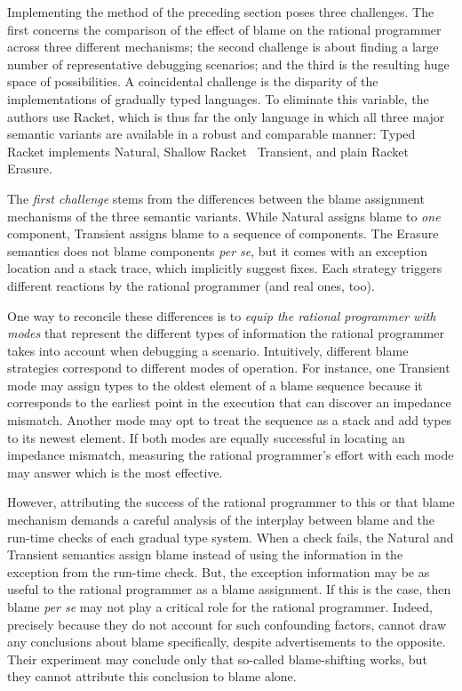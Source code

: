 
Implementing the method of the preceding section poses three challenges.  The
first concerns the comparison of the effect of blame on the rational programmer
across three different mechanisms; the second challenge is about finding a large
number of representative debugging scenarios; and the third is the resulting
huge space of possibilities. A coincidental challenge is the disparity of the
implementations of gradually typed languages. To eliminate this variable, the
authors use Racket, which is thus far the only language in which all three major
semantic variants are available in a robust and comparable manner: Typed Racket
implements Natural, Shallow Racket~\citep{ttt21} Transient, and plain Racket
Erasure.

The {\em first challenge\/} stems from the differences between the blame
assignment mechanisms of the three semantic variants.  While Natural assigns
blame to {\em one\/} component, Transient assigns blame to a sequence of
components. The Erasure semantics does not blame components {\it per se\/}, but
it comes with an exception location and a stack trace, which implicitly suggest
fixes.  Each strategy triggers different reactions by the rational programmer
(and real ones, too).

One way to reconcile these differences is to {\em equip the rational
programmer with modes \/} that represent the different types of
information the rational programmer takes into account when debugging a
scenario. Intuitively, different
blame strategies correspond to different modes of operation.
For instance, one Transient mode may assign types to the oldest element of a
blame sequence because it corresponds to the
earliest point in the execution that can discover an impedance
mismatch.  Another mode may opt to treat the sequence as a stack and add
types to its newest element.  If both modes are equally successful in
locating an impedance mismatch, measuring the rational programmer's effort with each mode
may answer which is the most effective.

However, attributing the success of the rational programmer to this or
that blame mechanism demands a careful analysis of the interplay between blame
and the run-time checks of each gradual type system. When a check fails,
the Natural and Transient semantics assign blame instead of using the
information in the exception from the run-time check. But, the
exception information may be as useful to the rational
programmer as a blame assignment. If this is the case, then blame {\em per se\/} may not play a critical
role for the rational programmer. Indeed, precisely because they do not
account for such confounding factors, \citet{lksfd-popl-2020} cannot draw any
conclusions about blame specifically, despite advertisements to the
opposite. Their experiment may conclude only that so-called blame-shifting
works, but they cannot attribute this conclusion to blame alone. 

